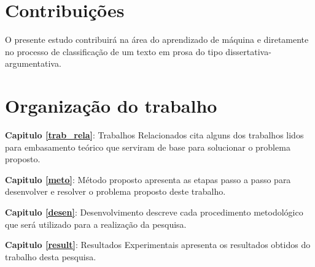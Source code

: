 \section{Contribuições}

O presente estudo contribuirá na área do aprendizado de máquina e diretamente no processo de classificação de um texto em prosa do tipo dissertativa-argumentativa.

\section{Organização do trabalho}

\noindent \textbf{Capitulo \ref{trab_rela}}: Trabalhos Relacionados cita alguns dos trabalhos lidos para  embasamento teórico que serviram de base para solucionar o problema proposto.

\noindent \textbf{Capitulo \ref{meto}}: Método proposto apresenta as etapas passo a passo para desenvolver e resolver o problema proposto deste trabalho.

\noindent \textbf{Capitulo \ref{desen}}: Desenvolvimento descreve cada procedimento metodológico que será
utilizado para a realização da pesquisa.

\noindent \textbf{Capitulo \ref{result}}: Resultados Experimentais apresenta os resultados obtidos do trabalho desta pesquisa.